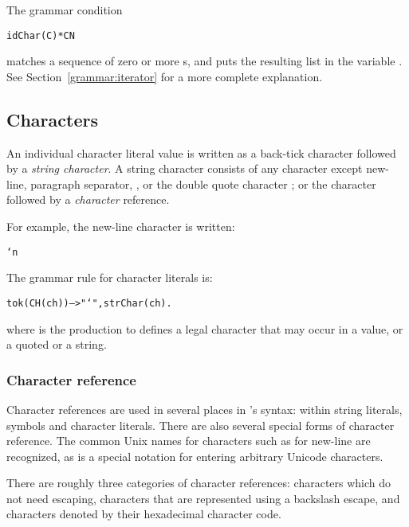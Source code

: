 \begin{aside}
The grammar condition
\begin{alltt}
idChar(C)*C\uphat{}N
\end{alltt}
matches a sequence of zero or more s, and puts the resulting list in the variable . See Section~\vref{grammar:iterator} for a more complete explanation.
\end{aside}

\subsection{Characters}
\label{token:char}

An individual character literal value is written as a back-tick character  followed by a \emph{string character}. A string character consists of any character except new-line, paragraph separator, , or the double quote character ; or the \constant{\bsl} character followed by a \emph{character} reference.

For example, the new-line character is written:
\begin{alltt}
`\bsl{}n
\end{alltt}

The grammar rule for character literals is:

\begin{alltt}
tok(CH(ch)) --> "\bsl{}`", strChar(ch).
\end{alltt}
where  is the production to defines a legal character that may occur in a  value, or a quoted  or a string.

\subsubsection{Character reference}
\label{token:stringcharacter}
  
Character references are used in several places in \go's syntax: within string literals, symbols and character literals. There are also several special forms of character reference. The common Unix names for characters such as  for new-line are recognized, as is a special notation for entering arbitrary Unicode characters.

There are roughly three categories of character references: characters which do not need escaping, characters that are represented using a backslash escape, and characters denoted by their hexadecimal character code.


